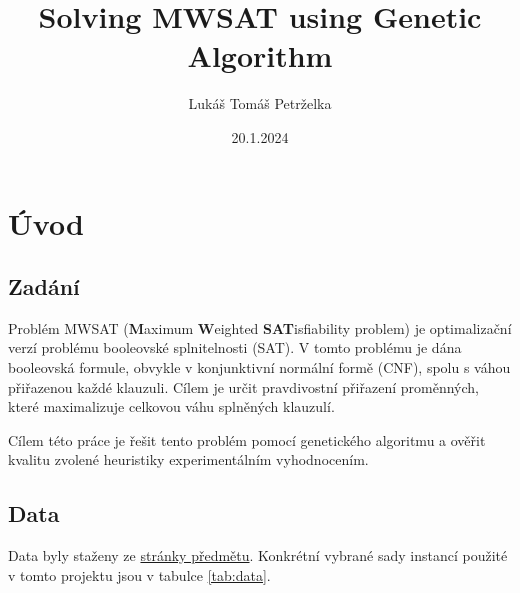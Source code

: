 \documentclass[12pt]{article}
\title{Solving MWSAT using Genetic Algorithm}
\author{
    Lukáš Tomáš Petrželka 
}
\date{20.1.2024}
\begin{document}
\maketitle

\vspace*{\fill}
\newpage

\vspace*{\fill}
\tableofcontents
\vspace*{\fill}
\newpage

\section{Úvod}

\subsection{Zadání}

Problém MWSAT (\textbf{M}aximum \textbf{W}eighted \textbf{SAT}isfiability problem) je optimalizační verzí problému booleovské splnitelnosti (SAT). V tomto problému je dána booleovská formule, obvykle v konjunktivní normální formě (CNF), spolu s váhou přiřazenou každé klauzuli. Cílem je určit pravdivostní přiřazení proměnných, které maximalizuje celkovou váhu splněných klauzulí.

Cílem této práce je řešit tento problém pomocí genetického algoritmu a ověřit kvalitu zvolené heuristiky experimentálním vyhodnocením.

\subsection{Data}
Data byly staženy ze \href{https://courses.fit.cvut.cz/NI-KOP/download/index.html#mwsatinst}{stránky předmětu}. Konkrétní vybrané sady instancí použité v tomto projektu jsou v tabulce \ref{tab:data}.
\end{document}
